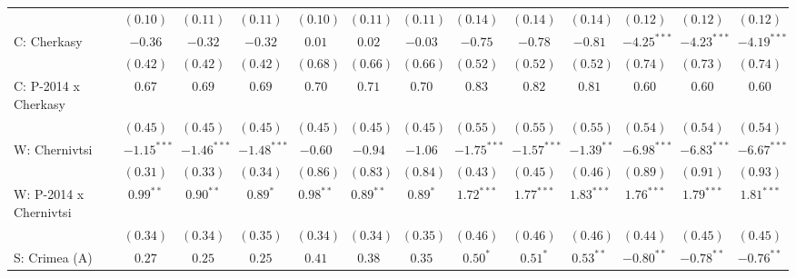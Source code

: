 \begin{table}
\begin{center}
\begin{tiny}
\begin{tabular}{l c c c c c c c c c c c c}
                            & $(0.10)$      & $(0.11)$      & $(0.11)$      & $(0.10)$     & $(0.11)$     & $(0.11)$     & $(0.14)$      & $(0.14)$      & $(0.14)$       & $(0.12)$      & $(0.12)$      & $(0.12)$      \\
C: Cherkasy                 & $-0.36$       & $-0.32$       & $-0.32$       & $0.01$       & $0.02$       & $-0.03$      & $-0.75$       & $-0.78$       & $-0.81$        & $-4.25^{***}$ & $-4.23^{***}$ & $-4.19^{***}$ \\
                            & $(0.42)$      & $(0.42)$      & $(0.42)$      & $(0.68)$     & $(0.66)$     & $(0.66)$     & $(0.52)$      & $(0.52)$      & $(0.52)$       & $(0.74)$      & $(0.73)$      & $(0.74)$      \\
C: P-2014 x Cherkasy        & $0.67$        & $0.69$        & $0.69$        & $0.70$       & $0.71$       & $0.70$       & $0.83$        & $0.82$        & $0.81$         & $0.60$        & $0.60$        & $0.60$        \\
                            & $(0.45)$      & $(0.45)$      & $(0.45)$      & $(0.45)$     & $(0.45)$     & $(0.45)$     & $(0.55)$      & $(0.55)$      & $(0.55)$       & $(0.54)$      & $(0.54)$      & $(0.54)$      \\
W: Chernivtsi               & $-1.15^{***}$ & $-1.46^{***}$ & $-1.48^{***}$ & $-0.60$      & $-0.94$      & $-1.06$      & $-1.75^{***}$ & $-1.57^{***}$ & $-1.39^{**}$   & $-6.98^{***}$ & $-6.83^{***}$ & $-6.67^{***}$ \\
                            & $(0.31)$      & $(0.33)$      & $(0.34)$      & $(0.86)$     & $(0.83)$     & $(0.84)$     & $(0.43)$      & $(0.45)$      & $(0.46)$       & $(0.89)$      & $(0.91)$      & $(0.93)$      \\
W: P-2014 x Chernivtsi      & $0.99^{**}$   & $0.90^{**}$   & $0.89^{*}$    & $0.98^{**}$  & $0.89^{**}$  & $0.89^{*}$   & $1.72^{***}$  & $1.77^{***}$  & $1.83^{***}$   & $1.76^{***}$  & $1.79^{***}$  & $1.81^{***}$  \\
                            & $(0.34)$      & $(0.34)$      & $(0.35)$      & $(0.34)$     & $(0.34)$     & $(0.35)$     & $(0.46)$      & $(0.46)$      & $(0.46)$       & $(0.44)$      & $(0.45)$      & $(0.45)$      \\
S: Crimea (A)               & $0.27$        & $0.25$        & $0.25$        & $0.41$       & $0.38$       & $0.35$       & $0.50^{*}$    & $0.51^{*}$    & $0.53^{**}$    & $-0.80^{**}$  & $-0.78^{**}$  & $-0.76^{**}$  \\

\end{tabular}
\end{tiny}
\end{center}
\end{table}
